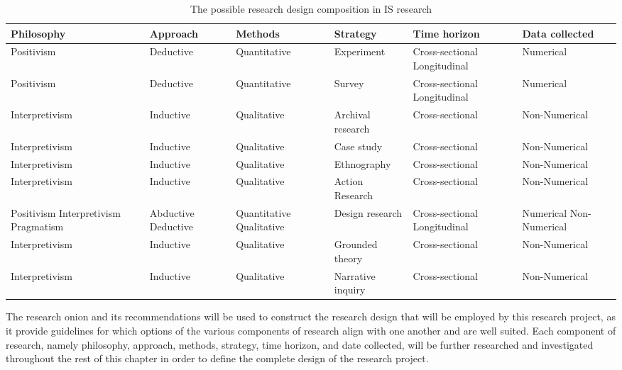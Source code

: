 \begin{table}[h!]
\centering
\small 
\begin{adjustbox}{max width=\textwidth}
\begin{tabular}{|p{2.2cm}|p{2.2cm}|p{2.2cm}|p{2.2cm}|p{2.5cm}|p{2.5cm}|}
\hline
\textbf{Philosophy} & \textbf{Approach} & \textbf{Methods} & \textbf{Strategy} & \textbf{Time horizon} & \textbf{Data collected} \\
\hline
Positivism & Deductive & Quantitative & Experiment & Cross-sectional Longitudinal & Numerical \\
\hline
Positivism & Deductive & Quantitative & Survey & Cross-sectional Longitudinal & Numerical \\
\hline
Interpretivism & Inductive & Qualitative & Archival research & Cross-sectional & Non-Numerical \\
\hline
Interpretivism & Inductive & Qualitative & Case study & Cross-sectional & Non-Numerical \\
\hline
Interpretivism & Inductive & Qualitative & Ethnography & Cross-sectional & Non-Numerical \\
\hline
Interpretivism & Inductive & Qualitative & Action Research & Cross-sectional & Non-Numerical \\
\hline
Positivism Interpretivism Pragmatism & Abductive Deductive & Quantitative Qualitative & Design research & Cross-sectional Longitudinal & Numerical Non-Numerical \\
\hline
Interpretivism & Inductive & Qualitative & Grounded theory & Cross-sectional & Non-Numerical \\
\hline
Interpretivism & Inductive & Qualitative & Narrative inquiry & Cross-sectional & Non-Numerical \\
\hline
\end{tabular}
\end{adjustbox}
\caption{The possible research design composition in IS research}
\end{table}
\par{The research onion and its recommendations will be used to construct the research design that will be employed by this research project, as it provide guidelines for which options of the various components of research align with one another and are well suited. Each component of research, namely philosophy, approach, methods, strategy, time horizon, and date collected, will be further researched and investigated throughout the rest of this chapter in order to define the complete design of the research project.}


